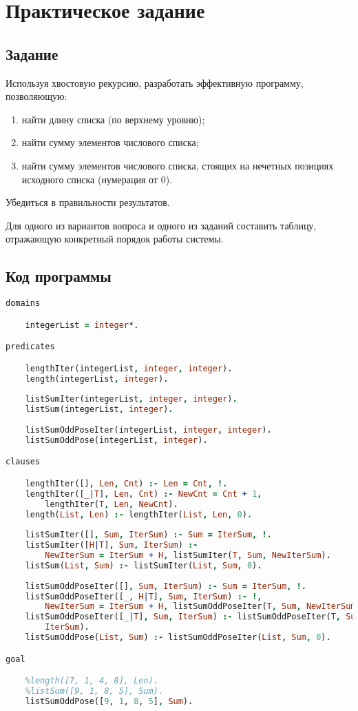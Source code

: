 \documentclass[14pt,a4paper]{scrreprt}
\begin{document}


\thispagestyle{empty}

\chapter{Практическое задание}

\section{Задание}

Используя хвостовую рекурсию, разработать эффективную программу, позволяющую:
\begin{enumerate}
	\item найти длину списка (по верхнему уровню);
	\item найти сумму элементов числового списка;
	\item найти сумму элементов числового списка, стоящих на нечетных позициях исходного списка (нумерация от 0).
\end{enumerate}
Убедиться в правильности результатов.

Для одного из вариантов вопроса и одного из заданий составить таблицу, отражающую конкретный порядок работы системы.

\section{Код программы}

\begin{lstlisting}[language=Prolog]
domains

	integerList = integer*.

predicates

	lengthIter(integerList, integer, integer).
	length(integerList, integer).
	
	listSumIter(integerList, integer, integer).
	listSum(integerList, integer).
	
	listSumOddPoseIter(integerList, integer, integer).
	listSumOddPose(integerList, integer).

clauses

	lengthIter([], Len, Cnt) :- Len = Cnt, !.
	lengthIter([_|T], Len, Cnt) :- NewCnt = Cnt + 1,
		lengthIter(T, Len, NewCnt).
	length(List, Len) :- lengthIter(List, Len, 0).
	
	listSumIter([], Sum, IterSum) :- Sum = IterSum, !.
	listSumIter([H|T], Sum, IterSum) :- 
		NewIterSum = IterSum + H, listSumIter(T, Sum, NewIterSum).
	listSum(List, Sum) :- listSumIter(List, Sum, 0).
	
	listSumOddPoseIter([], Sum, IterSum) :- Sum = IterSum, !.
	listSumOddPoseIter([_, H|T], Sum, IterSum) :- !, 
		NewIterSum = IterSum + H, listSumOddPoseIter(T, Sum, NewIterSum).
	listSumOddPoseIter([_|T], Sum, IterSum) :- listSumOddPoseIter(T, Sum, 
		IterSum).
	listSumOddPose(List, Sum) :- listSumOddPoseIter(List, Sum, 0).

goal

	%length([7, 1, 4, 8], Len).
	%listSum([9, 1, 8, 5], Sum).
	listSumOddPose([9, 1, 8, 5], Sum).
\end{lstlisting}
\end{document}
